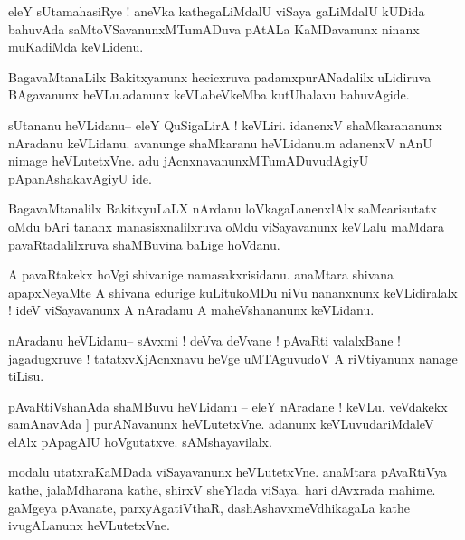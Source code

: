 \documentclass{article}
\begin{document}
\begin{mn}%
eleY sUtamahasiRye ! aneVka kathegaLiMdalU viSaya gaLiMdalU kUDida bahuvAda 
saMtoVSavanunxMTumADuva pAtALa KaMDavanunx ninanx muKadiMda keVLidenu.
\end{mn}

\begin{mn}%
BagavaMtanaLilx Bakitxyanunx hecicxruva padamxpurANadalilx uLidiruva BAgavanunx 
heVLu.adanunx keVLabeVkeMba kutUhalavu bahuvAgide.
\end{mn}

\begin{mn}%
sUtananu heVLidanu-- eleY QuSigaLirA ! keVLiri. idanenxV shaMkarananunx nAradanu keVLidanu. 
avanunge shaMkaranu heVLidanu.m adanenxV nAnU nimage heVLutetxVne. adu 
jAcnxnavanunxMTumADuvudAgiyU pApanAshakavAgiyU ide.
\end{mn}

\begin{mn}%
BagavaMtanalilx BakitxyuLaLX nArdanu loVkagaLanenxlAlx saMcarisutatx oMdu bAri tananx 
manasisxnalilxruva oMdu viSayavanunx keVLalu maMdara pavaRtadalilxruva shaMBuvina baLige 
hoVdanu.
\end{mn}

\begin{mn}%
A pavaRtakekx hoVgi shivanige namasakxrisidanu. anaMtara shivana apapxNeyaMte A shivana 
edurige kuLitukoMDu niVu nananxnunx keVLidiralalx ! ideV viSayavanunx A nAradanu A 
maheVshananunx keVLidanu.
\end{mn}

\begin{mn}%
nAradanu heVLidanu-- sAvxmi ! deVva deVvane ! pAvaRti valalxBane ! jagadugxruve ! 
tatatxvXjAcnxnavu heVge uMTAguvudoV A riVtiyanunx nanage tiLisu.
\end{mn}

\begin{mn}%
pAvaRtiVshanAda shaMBuvu heVLidanu -- eleY nAradane ! keVLu. veVdakekx samAnavAda ]
purANavanunx heVLutetxVne. adanunx keVLuvudariMdaleV elAlx pApagAlU hoVgutatxve. 
sAMshayavilalx.
\end{mn}

\begin{mn}%
modalu utatxraKaMDada viSayavanunx heVLutetxVne. anaMtara pAvaRtiVya kathe, jalaMdharana 
kathe, shirxV sheYlada viSaya. hari dAvxrada mahime. gaMgeya pAvanate, parxyAgatiVthaR, 
dashAshavxmeVdhikagaLa kathe ivugALanunx heVLutetxVne.
\end{mn}
\end{document}
